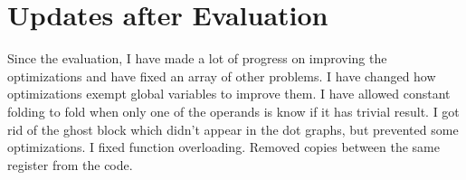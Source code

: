 \newpage
\section*{Updates after Evaluation}
Since the evaluation, I have made a lot of progress on improving the optimizations and have fixed an array of other problems. 
I have changed how optimizations exempt global variables to improve them. 
I have allowed constant folding to fold when only one of the operands is know if it has trivial result. 
I got rid of the ghost block which didn't appear in the dot graphs, but prevented some optimizations. 
I fixed function overloading. 
Removed copies between the same register from the code. 
